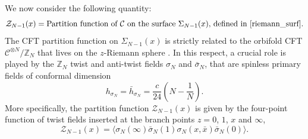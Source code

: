 \documentclass[a4paper,11pt]{article}
\begin{document}
We now consider the following quantity:
\begin{equation}
\mathcal{Z}_{N-1}(x)=\text{Partition function of $\mathcal{C}$ on the surface  $\Sigma_{N-1}(x)$, defined in \eqref{riemann_surf}}.
 \end{equation}
The CFT partition function on $\Sigma_{N-1}(x)$ is strictly related to the orbifold CFT $\mathcal{C}^{\otimes N}/\mathbb{Z}_N$ that lives on the $z$-Riemann sphere \cite{Dixon, Knizhnik}. In this respect, a crucial role is played by the $\mathbb{Z}_N$ twist and anti-twist fields $\sigma_N$ and $\bar{\sigma}_N$, that are  spinless primary fields of conformal dimension~\cite{Knizhnik}
\begin{equation}
 h_{\sigma_N}=\bar{h}_{\sigma_N}=\frac{c}{24}\left(N-\frac{1}{N}\right).
\end{equation}
More specifically, the partition function $\mathcal{Z}_{N-1}(x)$ is given by the four-point function of twist fields inserted at the branch points $z=0$, $1$, $x$ and $\infty$,
\begin{equation}
\label{geom_inter}
\mathcal{Z}_{N-1}(x)=\langle \sigma_N (\infty) \bar{\sigma}_N(1)\sigma_N(x,\bar{x}) \bar{\sigma}_N(0)\rangle.
 \end{equation}

\end{document}
